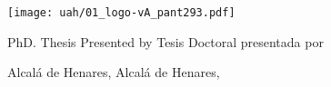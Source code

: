 \begin{bottomparagraph}
  \begin{center}

    \color{pantone293}

      \huge {\myThesisDefenseYear}
    \color{black}

  \end{center}
\end{bottomparagraph}


\clearemptydoublepage

 
\thispagestyle{empty}
\large
\begin{center}

  \color{pantone293}

  \centerline{\texttt{[image: uah/01\_logo-vA\_pant293.pdf]}}

  {
    \huge{{\myPhDProgramEnglish}}
  }
  {
    \huge{{\myPhDProgram}}
  }

  \vspace{2cm}   
  
  \Huge\textbf{\myBookTitle}

  \vspace{10mm}
  
  {
    \huge{{PhD. Thesis Presented by}}
  }
  {
    \huge{{Tesis Doctoral presentada por}}
  }

  \huge{\textbf{\myAuthorFullName}}


  \vspace{10mm}

  {
    \huge {\expandafter\makefirstuc\expandafter{\wordAdvisorOrAdvisors}}
  }
  {
    \huge {\expandafter\makefirstuc\expandafter{\wordDirectorOrDirectores}}
  }  

  \textbf{\myAdvisorsConDrOrDra}


  \color{black}
  

\end{center}

\begin{bottomparagraph}
  \begin{center}

    \color{pantone293}

    {
      \huge {Alcalá de Henares, \myThesisdefenseDateEnglish}
    }
    { 
      \huge {Alcalá de Henares, \myThesisDefenseDate}
    }  
    \color{black}

  \end{center}
\end{bottomparagraph}


\clearemptydoublepage






